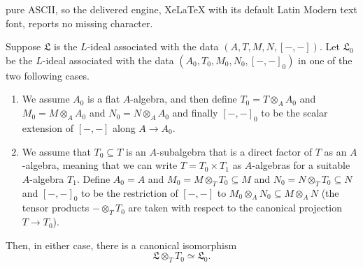 \documentclass[10pt,a4paper]{amsart}
\def\gL{\mathfrak L}
\begin{document}
pure ASCII, so the delivered engine, XeLaTeX with its default Latin Modern text font, reports no missing character.
\begin{lemma}\label{lem:base-change-lemma}
Suppose $\gL$ is the $L$-ideal associated with the data $(A,T,M,N,[-,-])$. Let $\gL_0$ be the $L$-ideal associated with the data $(A_0,T_0,M_0,N_0,[-,-]_0)$ in one of the two following cases.
\begin{enumerate}[label=(\alph*)]
\item We assume $A_0$ is a flat $A$-algebra, and then define $T_0 = T\otimes_A A_0$ and $M_0 = M\otimes_A A_0$ and $N_0 = N\otimes_A A_0$ and finally $[-,-]_0$ to be the scalar extension of $[-,-]$ along $A \rightarrow A_0$. \label{lemma-part:base-change-lemma-flat}
\item We assume that $T_0 \subseteq T$ is an $A$-subalgebra that is a direct factor of $T$ as an $A$-algebra, { meaning that we can write $T=T_0\times T_1$ as $A$-algebras for a suitable $A$-algebra $T_1$}. Define $A_0 = A$ and $M_0 = M\otimes_T T_0 \subseteq M$ and $N_0 = N\otimes_T T_0 \subseteq N$ and $[-,-]_0$ to be the restriction of $[-,-]$ to $M_0 \otimes_A N_0 \subseteq M\otimes_A N$ 
{(the tensor products $-\otimes_TT_0$ are taken with respect to the canonical projection $T\rightarrow T_0$)}.\label{lemma-part:base-change-lemma-factor}
\end{enumerate}
Then, in either case, there is a canonical isomorphism
\begin{equation*}
\gL\otimes_T T_0 \simeq \gL_0.
\end{equation*}
\end{lemma}
\end{document}
